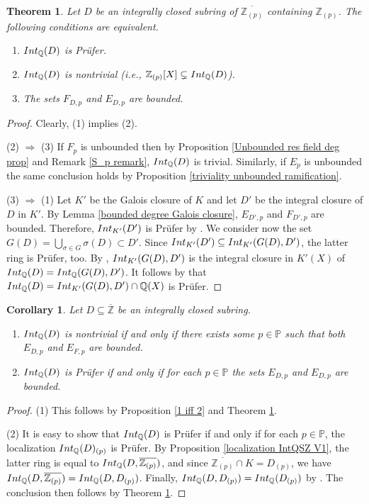 \documentclass{article}
\newtheorem{Thm}[equation]{Theorem}
\newtheorem{Cor}[equation]{Corollary}
\theoremstyle{definition}\newtheorem{Def}[equation]{Definition}
\theoremstyle{definition}\newtheorem{Ques}[equation]{Question}
\theoremstyle{definition}\newtheorem{Conj}[equation]{Conjecture}
\theoremstyle{definition}\newtheorem{Not}[equation]{Notation}
\newcommand{\Q}{\mathbb{Q}}
\newcommand{\oZ}{\overline{\Z}}
\newcommand{\Z}{\mathbb{Z}}
\newcommand{\Int}{\textnormal{Int}}
\newcommand{\IntQ}{\Int_{\Q}}
\newcommand{\PP}{\mathbb{P}}
\numberwithin{equation}{section}
\begin{document}
\begin{Thm}\label{nontrivial Prufer for rings}
Let $D$ be an integrally closed subring of $\overline{\Z_{(p)}}$ containing $\Z_{(p)}$. The following conditions are equivalent.
\begin{enumerate}[(1)]
\item $\IntQ(D)$ is Pr\"ufer.
\item $\IntQ(D)$ is nontrivial (i.e., $\Z_{(p)}[X] \subsetneq \IntQ(D)$).
\item The sets $F_{D,p}$ and $E_{D,p}$ are bounded.
\end{enumerate}
\end{Thm}
\begin{proof}
Clearly, (1) implies (2).

(2) $\Rightarrow$ (3) If $F_p$ is unbounded then by Proposition \ref{Unbounded res field deg prop} and Remark \ref{S_p remark}, $\IntQ(D)$ is trivial. Similarly, if $E_p$ is unbounded the same conclusion holds by Proposition \ref{triviality unbounded ramification}.

(3) $\Rightarrow$ (1)  Let $K'$ be the Galois closure of $K$ and let $D'$ be the integral closure of $D$ in $K'$. By Lemma \ref{bounded degree Galois closure}, $E_{D',p}$ and $F_{D',p}$ are bounded. Therefore, $\Int_{K'}(D')$ is Pr\"ufer by \cite[Theorem 2.5]{LopIntD}. We consider now the set $G(D)=\bigcup_{\sigma\in G}\sigma(D)\subset D'$. Since $\Int_{K'}(D')\subseteq\Int_{K'}(G(D),D')$, the latter ring is Pr\"ufer, too. By \cite[Lemma 2.20]{PerDedekind}, $\Int_{K'}(G(D),D')$ is the integral closure in $K'(X)$ of $\IntQ(D)=\IntQ(G(D),D')$.  It follows by \cite[Theorem 22.4]{Gilm} that $\IntQ(D)=\Int_{K'}(G(D),D')\cap\Q(X)$ is Pr\"ufer.
\end{proof}

\begin{Cor}
  Let $D\subseteq\oZ$ be an integrally closed subring.
  \begin{enumerate}[(1)]
      \item $\IntQ(D)$ is nontrivial if and only if there exists some $p\in\PP$ such that both $E_{D,p}$ and $E_{F,p}$ are bounded.
      \item $\IntQ(D)$ is Pr\"ufer if and only if for each $p\in\PP$ the sets $E_{D,p}$ and $E_{D,p}$ are bounded.
  \end{enumerate}
\end{Cor}
\begin{proof}
    (1) This follows by Proposition \ref{1 iff 2} and Theorem \ref{nontrivial Prufer for rings}.

    (2) It is easy to show that $\IntQ(D)$ is Pr\"ufer if and only if for each $p\in\PP$, the localization $\IntQ(D)_{(p)}$ is Pr\"ufer. By Proposition \ref{localization IntQSZ V1}, the latter ring is equal to $\IntQ(D,\overline{\Z_{(p)}})$, and since $\overline{\Z_{(p)}}\cap K=D_{(p)}$, we have $\IntQ(D,\overline{\Z_{(p)}})=\IntQ(D,D_{(p)})$. Finally, $\IntQ(D,D_{(p)})=\IntQ(D_{(p)})$ by \cite[Corollary I.2.6]{CaCh}. The conclusion then follows by Theorem \ref{nontrivial Prufer for rings}.   
    \end{proof}
\end{document}
